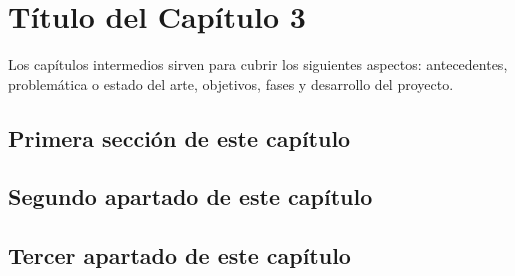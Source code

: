 \chapter{Título del Capítulo 3}
\label{ch:capítulo-tres}

Los capítulos intermedios sirven para cubrir los siguientes aspectos: antecedentes, problemática o estado del arte, objetivos, fases y desarrollo del proyecto.

\section{Primera sección de este capítulo}

\lipsum[-2]

\section{Segundo apartado de este capítulo}

\lipsum[3]

\section{Tercer apartado de este capítulo}

\lipsum[4]